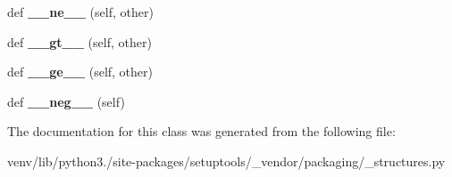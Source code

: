 \begin{DoxyCompactItemize}
\item 
\mbox{\label{classsetuptools_1_1__vendor_1_1packaging_1_1__structures_1_1_infinity_afd9bf7019c020510eeba5dc10424e9d1}} 
def {\bfseries \+\_\+\+\_\+ne\+\_\+\+\_\+} (self, other)
\item 
\mbox{\label{classsetuptools_1_1__vendor_1_1packaging_1_1__structures_1_1_infinity_a69a4fa3f4993c7a5dd2970c3fb6746c3}} 
def {\bfseries \+\_\+\+\_\+gt\+\_\+\+\_\+} (self, other)
\item 
\mbox{\label{classsetuptools_1_1__vendor_1_1packaging_1_1__structures_1_1_infinity_a2c04e1b4349f799a86b3e71ca8d4c92b}} 
def {\bfseries \+\_\+\+\_\+ge\+\_\+\+\_\+} (self, other)
\item 
\mbox{\label{classsetuptools_1_1__vendor_1_1packaging_1_1__structures_1_1_infinity_a432eeefa06f13db17457f09bfc295b38}} 
def {\bfseries \+\_\+\+\_\+neg\+\_\+\+\_\+} (self)
\end{DoxyCompactItemize}


The documentation for this class was generated from the following file\+:\begin{DoxyCompactItemize}
\item 
venv/lib/python3./site-\/packages/setuptools/\+\_\+vendor/packaging/\+\_\+structures.\+py\end{DoxyCompactItemize}
